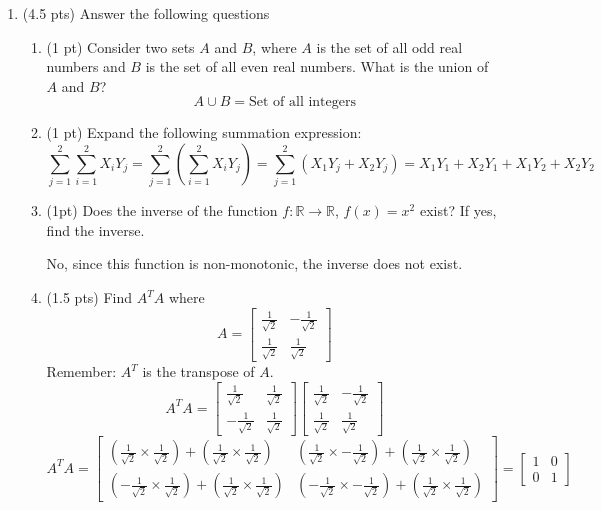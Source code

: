 \documentclass{./../../latex/tests}
\begin{document}
\thispagestyle{plain}
\vspace{0.5em}

\begin{enumerate}	

\item (4.5 pts) Answer the following questions
\begin{enumerate}
\item (1 pt) Consider two sets $A$ and $B$, where $A$ is the set of all odd real numbers and $B$ is the set of all even real numbers. What is the union of $A$ and $B$? 
\[ A \cup B = \text{Set of all integers} \]
\item (1 pt) Expand the following summation expression: \[\sum_{j=1}^2  \sum_{i=1}^2 X_i Y_j = \sum_{j=1}^2  \left(\sum_{i=1}^2 X_i Y_j \right) = \sum_{j=1}^2 \left( X_1 Y_j + X_2 Y_j \right) = X_1 Y_1 + X_2 Y_1 + X_1 Y_2 + X_2 Y_2 \]
 \vspace{1em}
\item (1pt) Does the inverse of the function $f: \mathbb{R} \rightarrow \mathbb{R}$, $f(x)=x^2$ exist? If yes, find the inverse. 

No, since this function is non-monotonic, the inverse does not exist. \\

\item (1.5 pts) Find $A^T A$ where \[ A=\begin{bmatrix}
	\frac{1}{\sqrt{2}} & -\frac{1}{\sqrt{2}} \\ \frac{1}{\sqrt{2}} & \frac{1}{\sqrt{2}}
\end{bmatrix} \]
Remember: $A^T$ is the transpose of $A$.
\[
A^T A = \begin{bmatrix}
\frac{1}{\sqrt{2}} & \frac{1}{\sqrt{2}} \\
-\frac{1}{\sqrt{2}} & \frac{1}{\sqrt{2}}
\end{bmatrix}
\begin{bmatrix}
\frac{1}{\sqrt{2}} & -\frac{1}{\sqrt{2}} \\
\frac{1}{\sqrt{2}} & \frac{1}{\sqrt{2}}
\end{bmatrix}
\]
\[
A^T A = \begin{bmatrix}
\left( \frac{1}{\sqrt{2}} \times \frac{1}{\sqrt{2}} \right) + \left( \frac{1}{\sqrt{2}} \times \frac{1}{\sqrt{2}} \right) & \left( \frac{1}{\sqrt{2}} \times -\frac{1}{\sqrt{2}} \right) + \left( \frac{1}{\sqrt{2}} \times \frac{1}{\sqrt{2}} \right) \\
\left( -\frac{1}{\sqrt{2}} \times \frac{1}{\sqrt{2}} \right) + \left( \frac{1}{\sqrt{2}} \times \frac{1}{\sqrt{2}} \right) & \left( -\frac{1}{\sqrt{2}} \times -\frac{1}{\sqrt{2}} \right) + \left( \frac{1}{\sqrt{2}} \times \frac{1}{\sqrt{2}} \right)
\end{bmatrix} = \begin{bmatrix}
1 & 0 \\
0 & 1
\end{bmatrix}
\] \\


\end{enumerate}
\end{enumerate}
\end{document}
